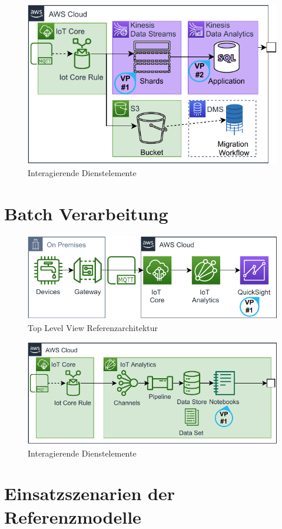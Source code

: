 \begin{figure}[H]
\centering
\includegraphics[height=0.33\textheight]{graphics/Echtzeit-RA-Elements.pdf}
\caption{Interagierende Dienstelemente}
\label{abb:ElementeEchtzeitRA}
\end{figure}



\section{Batch Verarbeitung}



\begin{figure}[H]
\centering
\includegraphics[width=\textwidth]{graphics/DB-RA-Overview.pdf}
\caption{Top Level View Referenzarchitektur}
\label{abb:TopLevelDBRA}
\end{figure}



\begin{figure}[H]
\centering
\includegraphics[width=\textwidth]{graphics/DB-RA-Elements.pdf}
\caption{Interagierende Dienstelemente}
\label{abb:ElementeDBRA}
\end{figure}

\section{Einsatzszenarien der Referenzmodelle}